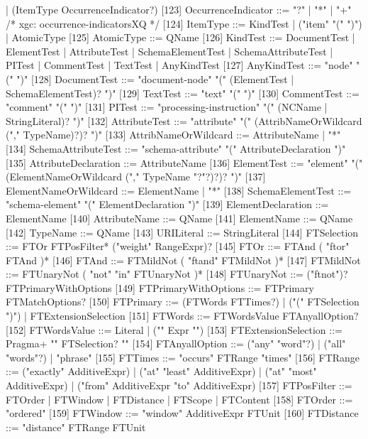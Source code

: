 | (ItemType OccurrenceIndicator?)
[123]   	OccurrenceIndicator	   ::=   	"?" | "*" | "+"	/* xgc: occurrence-indicatorsXQ */
[124]   	ItemType	   ::=   	KindTest | ("item" "(" ")") | AtomicType
[125]   	AtomicType	   ::=   	QName
[126]   	KindTest	   ::=   	DocumentTest
| ElementTest
| AttributeTest
| SchemaElementTest
| SchemaAttributeTest
| PITest
| CommentTest
| TextTest
| AnyKindTest
[127]   	AnyKindTest	   ::=   	"node" "(" ")"
[128]   	DocumentTest	   ::=   	"document-node" "(" (ElementTest | SchemaElementTest)? ")"
[129]   	TextTest	   ::=   	"text" "(" ")"
[130]   	CommentTest	   ::=   	"comment" "(" ")"
[131]   	PITest	   ::=   	"processing-instruction" "(" (NCName | StringLiteral)? ")"
[132]   	AttributeTest	   ::=   	"attribute" "(" (AttribNameOrWildcard ("," TypeName)?)? ")"
[133]   	AttribNameOrWildcard	   ::=   	AttributeName | "*"
[134]   	SchemaAttributeTest	   ::=   	"schema-attribute" "(" AttributeDeclaration ")"
[135]   	AttributeDeclaration	   ::=   	AttributeName
[136]   	ElementTest	   ::=   	"element" "(" (ElementNameOrWildcard ("," TypeName "?"?)?)? ")"
[137]   	ElementNameOrWildcard	   ::=   	ElementName | "*"
[138]   	SchemaElementTest	   ::=   	"schema-element" "(" ElementDeclaration ")"
[139]   	ElementDeclaration	   ::=   	ElementName
[140]   	AttributeName	   ::=   	QName
[141]   	ElementName	   ::=   	QName
[142]   	TypeName	   ::=   	QName
[143]   	URILiteral	   ::=   	StringLiteral
[144]   	FTSelection	   ::=   	FTOr FTPosFilter* ("weight" RangeExpr)?
[145]   	FTOr	   ::=   	FTAnd ( "ftor" FTAnd )*
[146]   	FTAnd	   ::=   	FTMildNot ( "ftand" FTMildNot )*
[147]   	FTMildNot	   ::=   	FTUnaryNot ( "not" "in" FTUnaryNot )*
[148]   	FTUnaryNot	   ::=   	("ftnot")? FTPrimaryWithOptions
[149]   	FTPrimaryWithOptions	   ::=   	FTPrimary FTMatchOptions?
[150]   	FTPrimary	   ::=   	(FTWords FTTimes?) | ("(" FTSelection ")") | FTExtensionSelection
[151]   	FTWords	   ::=   	FTWordsValue FTAnyallOption?
[152]   	FTWordsValue	   ::=   	Literal | ("{" Expr "}")
[153]   	FTExtensionSelection	   ::=   	Pragma+ "{" FTSelection? "}"
[154]   	FTAnyallOption	   ::=   	("any" "word"?) | ("all" "words"?) | "phrase"
[155]   	FTTimes	   ::=   	"occurs" FTRange "times"
[156]   	FTRange	   ::=   	("exactly" AdditiveExpr)
| ("at" "least" AdditiveExpr)
| ("at" "most" AdditiveExpr)
| ("from" AdditiveExpr "to" AdditiveExpr)
[157]   	FTPosFilter	   ::=   	FTOrder | FTWindow | FTDistance | FTScope | FTContent
[158]   	FTOrder	   ::=   	"ordered"
[159]   	FTWindow	   ::=   	"window" AdditiveExpr FTUnit
[160]   	FTDistance	   ::=   	"distance" FTRange FTUnit
